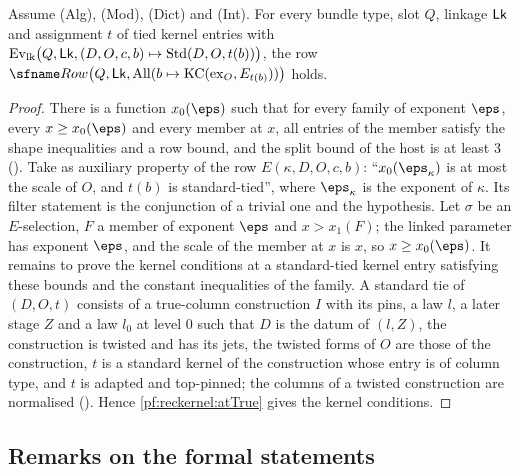 \begin{theorem}\label{pf:reckernel:pdv}
Assume \textup{(Alg)}, \textup{(Mod)}, \textup{(Dict)} and \textup{(Int)}. For every bundle type, slot $Q$, linkage
$\mathsf{Lk}$ and assignment $t$ of tied kernel entries with
$\mathrm{Ev}_{\mathrm{lk}}\bigl(Q,\mathsf{Lk},(D,O,c,b)\mapsto\mathrm{Std}(D,O,t(b))\bigr)$, the row
$\reckRow\bigl(Q,\reckLk,\reckAtAll(b\mapsto\mathrm{KC}(\mathrm{ex}_O,E_{t(b)}))\bigr)$ holds.
\end{theorem}

\begin{proof}
There is a function $x_0(\eps)$ such that for every family of exponent $\eps$, every $x\ge x_0(\eps)$ and every member
at $x$, all entries of the member satisfy the shape inequalities and a row bound, and the split bound of the host is at
least $3$ (). Take as auxiliary property of the row
$E(\kappa,D,O,c,b)$: ``$x_0(\eps_\kappa)$ is at most the scale of $O$, and $t(b)$ is standard-tied'', where
$\eps_\kappa$ is the exponent of $\kappa$. Its filter statement is the conjunction of a trivial one and the hypothesis.
Let $\sigma$ be an $E$-selection, $F$ a member of exponent $\eps$ and $x>x_1(F)$; the linked parameter has exponent
$\eps$, and the scale of the member at $x$ is $x$, so $x\ge x_0(\eps)$. It remains to prove the kernel conditions at a
standard-tied kernel entry satisfying these bounds and the constant inequalities of the family. A standard tie of
$(D,O,t)$ consists of a true-column construction $I$ with its pins, a law $l$, a later stage $Z$ and a law $l_0$ at level
$0$ such that $D$ is the datum of $(l,Z)$, the construction is twisted and has its jets, the twisted forms of $O$ are those
of the construction, $t$ is a standard kernel of the construction whose entry is of column type, and $t$ is adapted and
top-pinned; the columns of a twisted construction are normalised
(). Hence \cref{pf:reckernel:atTrue} gives the kernel conditions.
\end{proof}

\subsection{Remarks on the formal statements}\label{pf:reckernel:sec-remarks}

